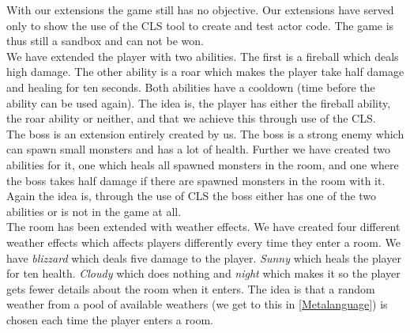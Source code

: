 With our extensions the game still has no objective. Our extensions have served only to show the use of the CLS tool to create and test actor code. The game is thus still a sandbox and can not be won.\\
We have extended the player with two abilities. The first is a fireball which deals high damage. The other ability is a roar which makes the player take half damage and healing for ten seconds. Both abilities have a cooldown (time before the ability can be used again). The idea is, the player has either the fireball ability, the roar ability or neither, and that we achieve this through use of the CLS.\\
The boss is an extension entirely created by us. The boss is a strong enemy which can spawn small monsters and has a lot of health. Further we have created two abilities for it, one which heals all spawned monsters in the room, and one where the boss takes half damage if there are spawned monsters in the room with it. Again the idea is, through the use of CLS the boss either has one of the two abilities or is not in the game at all.\\
The room has been extended with weather effects. We have created four different weather effects which affects players differently every time they enter a room. We have \textit{blizzard} which deals five damage to the player. \textit{Sunny} which heals the player for ten health. \textit{Cloudy} which does nothing and \textit{night} which makes it so the player gets fewer details about the room when it enters. The idea is that a random weather from a pool of available weathers (we get to this in \autoref{Metalanguage}) is chosen each time the player enters a room.
